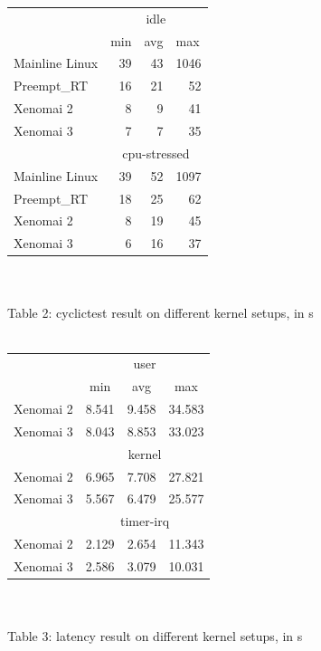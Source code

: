 \documentclass[10pt,a4paper]{article}
\begin{document}
\begin{multicols}{2}
\begin{tabular}{|l|r|r|r|}
\hline
\multirow{2}{*}{} & \multicolumn{3}{c|}{idle}  \\ \cline{2-4} 
 & \multicolumn{1}{l|}{min} & \multicolumn{1}{l|}{avg} & \multicolumn{1}{l|}{max} \\ \hline
Mainline Linux & 39 & 43 & 1046  \\ \hline
Preempt\_RT & 16 & 21 & 52 \\ \hline
Xenomai 2 & 8 & 9 & 41 \\ \hline
Xenomai 3 & 7 & 7 & 35 \\ \hline
 & \multicolumn{3}{c|}{cpu-stressed} \\ \hline
Mainline Linux & 39 & 52 & 1097 \\ \hline
Preempt\_RT & 18 & 25 & 62 \\ \hline
Xenomai 2 & 8 & 19 & 45 \\ \hline
Xenomai 3 & 6 & 16 & 37 \\ \hline
\end{tabular}\\
\vspace{4mm} \\
Table 2: cyclictest result on different kernel setups, in \textmu s\\
\vspace{4mm} \\
\begin{tabular}{|l|c|r|r|}
\hline
\multirow{2}{*}{} & \multicolumn{3}{c|}{user} \\ \cline{2-4} 
 & min & \multicolumn{1}{c|}{avg} & \multicolumn{1}{c|}{max} \\ \hline
Xenomai 2 & 8.541 & 9.458 & 34.583 \\ \hline
Xenomai 3 & 8.043 & 8.853 & 33.023 \\ \hline
& \multicolumn{3}{c|}{kernel}      \\ \hline
Xenomai 2 & 6.965 & 7.708 & 27.821 \\ \hline
Xenomai 3 & 5.567 & 6.479 & 25.577 \\ \hline
& \multicolumn{3}{c|}{timer-irq}   \\ \hline
Xenomai 2 & 2.129 & 2.654 & 11.343 \\ \hline
Xenomai 3 & 2.586 & 3.079 & 10.031 \\ \hline
\end{tabular}\\
\vspace{4mm} \\
Table 3: latency result on different kernel setups, in \textmu s\\
\vspace{4mm}


\end{multicols}
\end{document}
